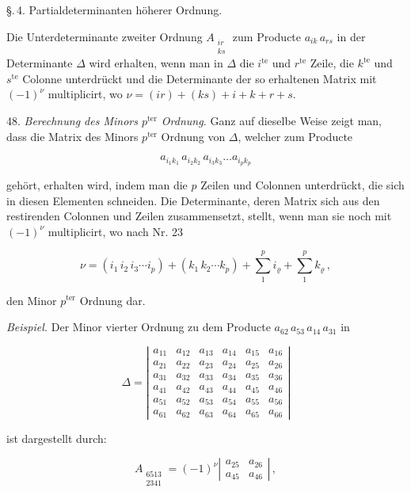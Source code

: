 \documentclass[11pt]{article}
\providecommand{\weberpage}[1]{}
\begin{document}
\weberpage{53}
\S.\,4. Partialdeterminanten h\"oherer Ordnung.

\glqq Die Unterdeterminante zweiter Ordnung $A_{\substack{ir\\ks}}$ zum Producte $a_{ik}\,a_{rs}$
in der Determinante $\varDelta$ wird erhalten, wenn man in $\varDelta$ die $i^{\text{te}}$ und
$r^{\text{te}}$ Zeile, die $k^{\text{te}}$ und $s^{\text{te}}$ Colonne unterdr\"uckt und die
Determinante der so erhaltenen Matrix mit $(-1)^\nu$ multiplicirt, wo $\nu=(ir)+(ks)+i+k+r+s$.\grqq{}

48. \textit{Berechnung des Minors $p^{\text{ter}}$ Ordnung.} Ganz auf dieselbe Weise zeigt man,
dass die Matrix des Minors $p^{\text{ter}}$ Ordnung von $\varDelta$, welcher zum Producte

\[
a_{i_1 k_1}\, a_{i_2 k_2}\, a_{i_3 k_3} \dots a_{i_p k_p}
\]

geh\"ort, erhalten wird, indem man die $p$ Zeilen und Colonnen unterdr\"uckt, die sich in diesen
Elementen schneiden. Die Determinante, deren Matrix sich aus den restirenden Colonnen und Zeilen
zusammensetzt, stellt, wenn man sie noch mit $(-1)^\nu$ multiplicirt, wo nach Nr. 23

\[
\nu = (i_1\,i_2\,i_3 \cdots i_p) + (k_1\,k_2 \cdots k_p) + \sum_1^p i_\varrho + \sum_1^p k_\varrho \,,
\]

den Minor $p^{\text{ter}}$ Ordnung dar.

\textit{Beispiel.} Der Minor vierter Ordnung zu dem Producte $a_{62}\,a_{53}\,a_{14}\,a_{31}$ in

\[
\varDelta = \left|
\begin{array}{cccccc}
a_{11} & a_{12} & a_{13} & a_{14} & a_{15} & a_{16} \\
a_{21} & a_{22} & a_{23} & a_{24} & a_{25} & a_{26} \\
a_{31} & a_{32} & a_{33} & a_{34} & a_{35} & a_{36} \\
a_{41} & a_{42} & a_{43} & a_{44} & a_{45} & a_{46} \\
a_{51} & a_{52} & a_{53} & a_{54} & a_{55} & a_{56} \\
a_{61} & a_{62} & a_{63} & a_{64} & a_{65} & a_{66}
\end{array}
\right|
\]

ist dargestellt durch:

\[
A_{\substack{6513\\2341}} = (-1)^\nu \left| \begin{array}{cc} a_{25} & a_{26} \\ a_{45} & a_{46} \end{array} \right|\,,
\]
\end{document}
